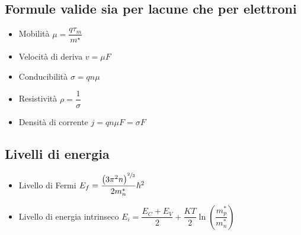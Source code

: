 \documentclass{article}
\begin{document}
\subsection{Formule valide sia per lacune che per elettroni}
\begin{itemize}
  \item Mobilità \( \mu = \dfrac{q \tau_m}{m^\star} \)
  \item Velocità di deriva \( v = \mu F \)
  \item Conducibilità \( \sigma = q n \mu \)
  \item Resistività \( \rho = \dfrac{1}{\sigma} \)
  \item Densità di corrente \( j = q n \mu F = \sigma F \)
\end{itemize}

\subsection{Livelli di energia}
\begin{itemize}
  \item Livello di Fermi \( E_f = \dfrac{ \left(3 \pi^2 n\right)^{\sfrac{2}{3}} }{2 m_n^*} \hbar ^ 2 \)
  \item Livello di energia intrinseco \( E_i = \dfrac{E_C + E_V}{2} + \dfrac{K T}{2} \ln\left( \dfrac{m_p^*}{m_n^*}\right) \)
\end{itemize}
\end{document}
